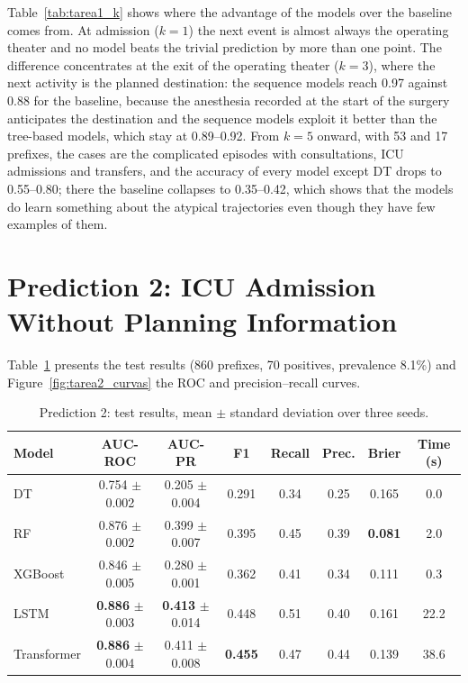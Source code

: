 Table~\ref{tab:tarea1_k} shows where the advantage of the models over the baseline comes from. At admission ($k=1$) the next event is almost always the operating theater and no model beats the trivial prediction by more than one point. The difference concentrates at the exit of the operating theater ($k=3$), where the next activity is the planned destination: the sequence models reach 0.97 against 0.88 for the baseline, because the anesthesia recorded at the start of the surgery anticipates the destination and the sequence models exploit it better than the tree-based models, which stay at 0.89--0.92. From $k=5$ onward, with 53 and 17 prefixes, the cases are the complicated episodes with consultations, ICU admissions and transfers, and the accuracy of every model except DT drops to 0.55--0.80; there the baseline collapses to 0.35--0.42, which shows that the models do learn something about the atypical trajectories even though they have few examples of them.

\section{Prediction 2: ICU Admission Without Planning Information}
\label{sec:pred2}

Table~\ref{tab:tarea2} presents the test results (860 prefixes, 70 positives, prevalence 8.1\%) and Figure~\ref{fig:tarea2_curvas} the ROC and precision--recall curves.

\begin{table}[htbp]
\centering
\caption{Prediction 2: test results, mean $\pm$ standard deviation over three seeds.}
\label{tab:tarea2}
\small
\begin{tabular}{lccccccc}
\toprule
Model & AUC-ROC & AUC-PR & F1 & Recall & Prec. & Brier & Time (s) \\
\midrule
DT & 0.754 $\pm$ 0.002 & 0.205 $\pm$ 0.004 & 0.291 & 0.34 & 0.25 & 0.165 & 0.0 \\
RF & 0.876 $\pm$ 0.002 & 0.399 $\pm$ 0.007 & 0.395 & 0.45 & 0.39 & \textbf{0.081} & 2.0 \\
XGBoost & 0.846 $\pm$ 0.005 & 0.280 $\pm$ 0.001 & 0.362 & 0.41 & 0.34 & 0.111 & 0.3 \\
LSTM & \textbf{0.886} $\pm$ 0.003 & \textbf{0.413} $\pm$ 0.014 & 0.448 & 0.51 & 0.40 & 0.161 & 22.2 \\
Transformer & \textbf{0.886} $\pm$ 0.004 & 0.411 $\pm$ 0.008 & \textbf{0.455} & 0.47 & 0.44 & 0.139 & 38.6 \\
\bottomrule
\end{tabular}
\end{table}

